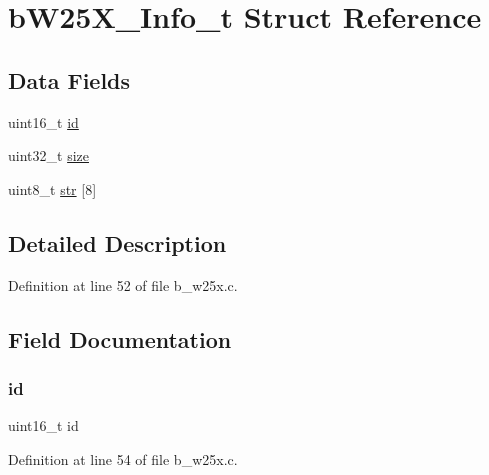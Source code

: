 \hypertarget{structb_w25_x___info__t}{}\section{b\+W25\+X\+\_\+\+Info\+\_\+t Struct Reference}
\label{structb_w25_x___info__t}
\subsection*{Data Fields}
\begin{DoxyCompactItemize}
\item 
uint16\+\_\+t \mbox{\hyperlink{structb_w25_x___info__t_a4fc3a0c58dfbd1e68224521185cb9384}{id}}
\item 
uint32\+\_\+t \mbox{\hyperlink{structb_w25_x___info__t_ab2c6b258f02add8fdf4cfc7c371dd772}{size}}
\item 
uint8\+\_\+t \mbox{\hyperlink{structb_w25_x___info__t_ac3d68b06876e51e9e7a74e389c73b09c}{str}} \mbox{[}8\mbox{]}
\end{DoxyCompactItemize}


\subsection{Detailed Description}


Definition at line 52 of file b\+\_\+w25x.\+c.



\subsection{Field Documentation}
\mbox{\label{structb_w25_x___info__t_a4fc3a0c58dfbd1e68224521185cb9384}} 
\subsubsection{\texorpdfstring{id}{id}}
{\footnotesize\ttfamily uint16\+\_\+t id}



Definition at line 54 of file b\+\_\+w25x.\+c.

\mbox{\label{structb_w25_x___info__t_ab2c6b258f02add8fdf4cfc7c371dd772}} 
